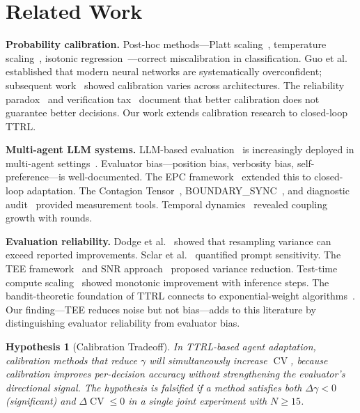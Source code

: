 \documentclass[11pt]{article}
\DeclareMathOperator{\CV}{CV}
\newtheorem{hypothesis}{Hypothesis}
\begin{document}
\section{Related Work}

\textbf{Probability calibration.} Post-hoc methods---Platt scaling~\cite{platt1999probabilistic}, temperature scaling~\cite{kull2017temperature}, isotonic regression~\cite{niculescu2005predicting}---correct miscalibration in classification. Guo et al.~\cite{guo2017calibration} established that modern neural networks are systematically overconfident; subsequent work~\cite{minderer2021revisiting} showed calibration varies across architectures. The reliability paradox~\cite{he2026paradox} and verification tax~\cite{mills2026verification} document that better calibration does not guarantee better decisions. Our work extends calibration research to closed-loop TTRL.

\textbf{Multi-agent LLM systems.} LLM-based evaluation~\cite{zheng2023judging,chiang2024chatbot} is increasingly deployed in multi-agent settings~\cite{li2023camel,wu2024autogen}. Evaluator bias---position bias, verbosity bias, self-preference---is well-documented. The EPC framework~\cite{liu2026epc} extended this to closed-loop adaptation. The Contagion Tensor~\cite{liu2026tensor}, BOUNDARY\_SYNC~\cite{liu2026boundarysync}, and diagnostic audit~\cite{liu2026audit} provided measurement tools. Temporal dynamics~\cite{liu2026temporal} revealed coupling growth with rounds.

\textbf{Evaluation reliability.} Dodge et al.~\cite{dodge2019reproducibility} showed that resampling variance can exceed reported improvements. Sclar et al.~\cite{sclar2024quantifying} quantified prompt sensitivity. The TEE framework~\cite{messing2026tee} and SNR approach~\cite{heineman2025snr} proposed variance reduction. Test-time compute scaling~\cite{snell2024scaling} showed monotonic improvement with inference steps. The bandit-theoretic foundation of TTRL connects to exponential-weight algorithms~\cite{bubeck2012regret}. Our finding---TEE reduces noise but not bias---adds to this literature by distinguishing evaluator reliability from evaluator bias.

\begin{hypothesis}[Calibration Tradeoff]
In TTRL-based agent adaptation, calibration methods that reduce $\gamma$ will simultaneously increase $\CV$, because calibration improves per-decision accuracy without strengthening the evaluator's directional signal. The hypothesis is falsified if a method satisfies \textit{both} $\Delta\gamma < 0$ (significant) \textit{and} $\Delta\CV \leq 0$ in a single joint experiment with $N \geq 15$.
\end{hypothesis}
\end{document}
